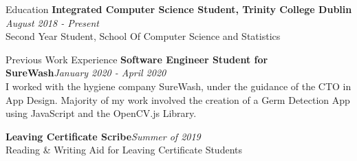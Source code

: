 \documentclass{resume} %
\begin{document}
\begin{rSection}{Education}
{\bf Integrated Computer Science Student, Trinity College Dublin} \hfill {\em August 2018 - Present}
\\ Second Year Student, School Of Computer Science and Statistics

\end{rSection}


\begin{rSection}{Previous Work Experience}
{\bf Software Engineer Student for SureWash}\hfill {\em January 2020 - April 2020}\\
I worked with the hygiene company SureWash, under the guidance of the CTO in App Design. Majority of my work involved the creation of a Germ Detection App using JavaScript and the OpenCV.js Library.

{\bf Leaving Certificate Scribe}\hfill {\em Summer of 2019}\\
Reading \& Writing Aid for Leaving Certificate Students

\end{rSection}


\end{document}
